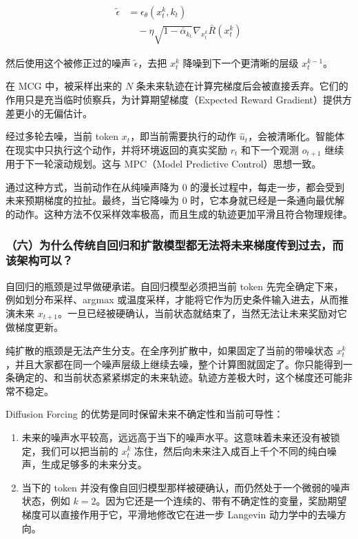 \[
\begin{aligned}
\tilde{\epsilon}
&=
\epsilon_\theta(x_t^k,k_t)
\\
&\quad -
\eta\sqrt{1-\bar{\alpha}_{k_t}}\nabla_{x_t^k}\bar{R}(x_t^k)
\end{aligned}
\]

然后使用这个被修正过的噪声 \(\tilde{\epsilon}\)，去把 \(x_t^k\) 降噪到下一个更清晰的层级 \(x_t^{k-1}\)。

在 MCG 中，被采样出来的 \(N\) 条未来轨迹在计算完梯度后会被直接丢弃。它们的作用只是充当临时侦察兵，为计算期望梯度（Expected Reward Gradient）提供方差更小的无偏估计。

经过多轮去噪，当前 token \(x_t\)，即当前需要执行的动作 \(\hat{u}_t\)，会被清晰化。智能体在现实中只执行这个动作，并将环境返回的真实奖励 \(r_t\) 和下一个观测 \(o_{t+1}\) 继续用于下一轮滚动规划。这与 MPC（Model Predictive Control）思想一致。

通过这种方式，当前动作在从纯噪声降为 0 的漫长过程中，每走一步，都会受到未来预期梯度的拉扯。最终，当它降噪为 0 时，它本身就已经是一条通向最优解的动作。这种方法不仅采样效率极高，而且生成的轨迹更加平滑且符合物理规律。

\hypertarget{ux516dux4e3aux4ec0ux4e48ux4f20ux7edfux81eaux56deux5f52ux548cux6269ux6563ux6a21ux578bux90fdux65e0ux6cd5ux5c06ux672aux6765ux68afux5ea6ux4f20ux5230ux8fc7ux53bbux800cux8be5ux67b6ux6784ux53efux4ee5}{%
\subsubsection{（六）为什么传统自回归和扩散模型都无法将未来梯度传到过去，而该架构可以？}\label{ux516dux4e3aux4ec0ux4e48ux4f20ux7edfux81eaux56deux5f52ux548cux6269ux6563ux6a21ux578bux90fdux65e0ux6cd5ux5c06ux672aux6765ux68afux5ea6ux4f20ux5230ux8fc7ux53bbux800cux8be5ux67b6ux6784ux53efux4ee5}}

自回归的瓶颈是过早做硬承诺。自回归模型必须把当前 token 先完全确定下来，例如划分布采样、argmax 或温度采样，才能将它作为历史条件输入进去，从而推演未来 \(x_{t+1}\)。一旦已经被硬确认，当前状态就结束了，当然无法让未来奖励对它做梯度更新。

纯扩散的瓶颈是无法产生分支。在全序列扩散中，如果固定了当前的带噪状态 \(x_t^k\)，并且大家都在同一个噪声层级上继续去噪，整个计算图就固定了。你只能得到一条确定的、和当前状态紧紧绑定的未来轨迹。轨迹方差极大时，这个梯度还可能非常不稳定。

Diffusion Forcing 的优势是同时保留未来不确定性和当前可导性：

\begin{enumerate}
\def\labelenumi{\arabic{enumi}.}
\tightlist
\item
  未来的噪声水平较高，远远高于当下的噪声水平。这意味着未来还没有被锁定，我们可以把当前的 \(x_t^k\) 冻住，然后向未来注入成百上千个不同的纯白噪声，生成足够多的未来分支。
\item
  当下的 token 并没有像自回归模型那样被硬确认，而仍然处于一个微弱的噪声状态，例如 \(k=2\)。因为它还是一个连续的、带有不确定性的变量，奖励期望梯度可以直接作用于它，平滑地修改它在进一步 Langevin 动力学中的去噪方向。
\end{enumerate}

